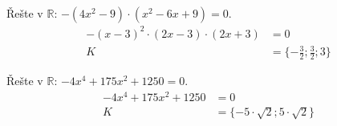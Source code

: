 \documentclass[11pt,a4paper]{article}
\begin{document}
\begin{zadaniReseniBox}[title={Rozšíření 1}]
Řešte v $\mathbb R$: $- \left(4x^{2} - 9\right) \cdot \left(x^{2} - 6x + 9\right)=0$.
\tcblower
\[
\begin{aligned}- \left(x - 3\right)^{2} \cdot \left(2x - 3\right) \cdot \left(2x + 3\right)&=0\\K&=\{- \frac{3}{2};\frac{3}{2};3\}\end{aligned}
\]
\end{zadaniReseniBox}

\begin{zadaniReseniBox}[title={Rozšíření 2}]
Řešte v $\mathbb R$: $- 4x^{4} + 175x^{2} + 1250=0$.
\tcblower
\[
\begin{aligned}- 4x^{4} + 175x^{2} + 1250&=0\\K&=\{- 5 \cdot \sqrt{2};5 \cdot \sqrt{2}\}\end{aligned}
\]
\end{zadaniReseniBox}
\end{document}
